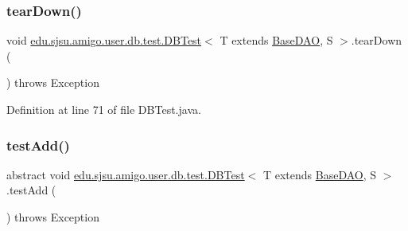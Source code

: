 \subsubsection{\texorpdfstring{tear\+Down()}{tearDown()}}
{\footnotesize\ttfamily void \hyperlink{classedu_1_1sjsu_1_1amigo_1_1user_1_1db_1_1test_1_1_d_b_test}{edu.\+sjsu.\+amigo.\+user.\+db.\+test.\+D\+B\+Test}$<$ T extends \hyperlink{interfaceedu_1_1sjsu_1_1amigo_1_1db_1_1common_1_1_base_d_a_o}{Base\+D\+AO}, S $>$.tear\+Down (\begin{DoxyParamCaption}{ }\end{DoxyParamCaption}) throws Exception}



Definition at line 71 of file D\+B\+Test.\+java.

\mbox{\label{classedu_1_1sjsu_1_1amigo_1_1user_1_1db_1_1test_1_1_d_b_test_a3d3d0f732c1d1d9f5cd5f526e9ae1804}} 
\subsubsection{\texorpdfstring{test\+Add()}{testAdd()}}
{\footnotesize\ttfamily abstract void \hyperlink{classedu_1_1sjsu_1_1amigo_1_1user_1_1db_1_1test_1_1_d_b_test}{edu.\+sjsu.\+amigo.\+user.\+db.\+test.\+D\+B\+Test}$<$ T extends \hyperlink{interfaceedu_1_1sjsu_1_1amigo_1_1db_1_1common_1_1_base_d_a_o}{Base\+D\+AO}, S $>$.test\+Add (\begin{DoxyParamCaption}{ }\end{DoxyParamCaption}) throws Exception\hspace{0.3cm}{\ttfamily [abstract]}}

\mbox{\label{classedu_1_1sjsu_1_1amigo_1_1user_1_1db_1_1test_1_1_d_b_test_a0609cbc687512b402b1dc47ada47ede5}} 
